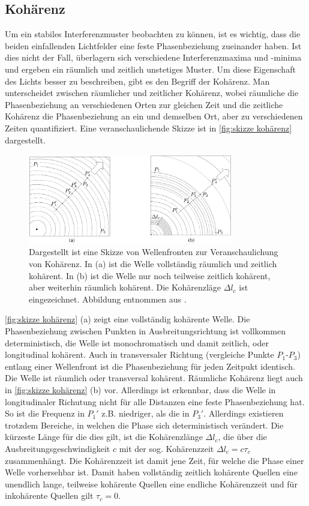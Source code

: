 \subsection{Kohärenz}
\label{ssec:Kohärenz}
Um ein stabiles Interferenzmuster beobachten zu können, ist es wichtig, dass die beiden einfallenden Lichtfelder eine feste Phasenbeziehung zueinander haben. 
Ist dies nicht der Fall, überlagern sich verschiedene Interferenzmaxima und -minima und ergeben ein räumlich und zeitlich unstetiges Muster. 
Um diese Eigenschaft des Lichts besser zu beschreiben, gibt es den Begriff der Kohärenz.
Man unterscheidet zwischen räumlicher und zeitlicher Kohärenz, wobei räumliche die Phasenbeziehung an verschiedenen Orten zur gleichen Zeit und die zeitliche Kohärenz die Phasenbeziehung an ein und demselben Ort, aber zu verschiedenen Zeiten quantifiziert. \cite[Kap. 9.2]{hechtOptik2018}
Eine veranschaulichende Skizze ist in \autoref{fig:skizze kohärenz} dargestellt.
\begin{figure}[htbp]
    \centering
    \includegraphics[width=0.8\textwidth]{images/Theorie/Hecht_9.6.png}
    \caption{Dargestellt ist eine Skizze von Wellenfronten zur Veranschaulichung von Kohärenz. In (a) ist die Welle vollständig räumlich und zeitlich kohärent. In (b) ist die Welle nur noch teilweise zeitlich kohärent, aber weiterhin räumlich kohärent. Die Kohärenzläge $\Delta l_c$ ist eingezeichnet. Abbildung entnommen aus \cite{hechtOptik2018}.}
    \label{fig:skizze kohärenz}
\end{figure}
\autoref{fig:skizze kohärenz} (a) zeigt eine vollständig kohärente Welle. Die Phasenbeziehung zwischen Punkten in Ausbreitungsrichtung ist vollkommen deterministisch, die Welle ist monochromatisch und damit zeitlich, oder longitudinal kohärent. 
Auch in transversaler Richtung (vergleiche Punkte $P_1$-$P_3$) entlang einer Wellenfront ist die Phasenbeziehung für jeden Zeitpukt identisch. 
Die Welle ist räumlich oder transversal kohärent. 
Räumliche Kohärenz liegt auch in \autoref{fig:skizze kohärenz} (b) vor. 
Allerdings ist erkennbar, dass die Welle in longitudinaler Richutung nicht für alle Distanzen eine feste Phasenbeziehung hat. 
So ist die Frequenz in $P_1'$ z.B. niedriger, als die in $P_3'$. 
Allerdings existieren trotzdem Bereiche, in welchen die Phase sich deterministisch verändert. 
Die kürzeste Länge für die dies gilt, ist die Kohärenzlänge $\Delta l_c$, die über die Ausbreitungsgeschwindigkeit $c$ mit der sog. Kohärenzzeit $\Delta l_c = c\tau_c$ zusammenhängt. 
Die Kohärenzzeit ist damit jene Zeit, für welche die Phase einer Welle vorhersehbar ist. 
Damit haben vollständig zeitlich kohärente Quellen eine unendlich lange, teilweise kohärente Quellen eine endliche Kohärenzzeit und für inkohärente Quellen gilt $\tau_c =0$. 

